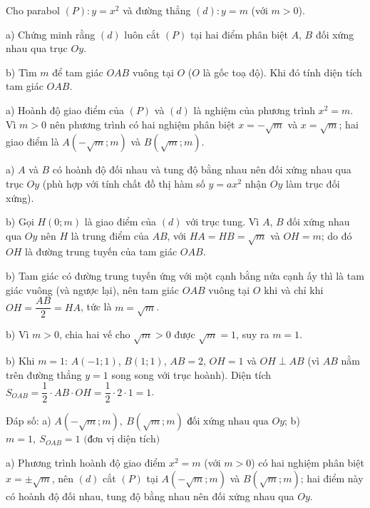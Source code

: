 \begin{problem}[9DS-HSB2-015]
Cho parabol $(P)\colon y = x^2$ và đường thẳng $(d)\colon y = m$ (với $m > 0$).

a) Chứng minh rằng $(d)$ luôn cắt $(P)$ tại hai điểm phân biệt $A$, $B$ đối xứng nhau qua trục $Oy$.

b) Tìm $m$ để tam giác $OAB$ vuông tại $O$ ($O$ là gốc toạ độ). Khi đó tính diện tích tam giác $OAB$.

\begin{solution}
a) Hoành độ giao điểm của $(P)$ và $(d)$ là nghiệm của phương trình $x^2 = m$. Vì $m > 0$ nên phương trình có hai nghiệm phân biệt $x = -\sqrt{m}$ và $x = \sqrt{m}$; hai giao điểm là $A\left(-\sqrt{m}; m\right)$ và $B\left(\sqrt{m}; m\right)$.

a) $A$ và $B$ có hoành độ đối nhau và tung độ bằng nhau nên đối xứng nhau qua trục $Oy$ (phù hợp với tính chất đồ thị hàm số $y = ax^2$ nhận $Oy$ làm trục đối xứng).

b) Gọi $H(0; m)$ là giao điểm của $(d)$ với trục tung. Vì $A$, $B$ đối xứng nhau qua $Oy$ nên $H$ là trung điểm của $AB$, với $HA = HB = \sqrt{m}$ và $OH = m$; do đó $OH$ là đường trung tuyến của tam giác $OAB$.

b) Tam giác có đường trung tuyến ứng với một cạnh bằng nửa cạnh ấy thì là tam giác vuông (và ngược lại), nên tam giác $OAB$ vuông tại $O$ khi và chỉ khi $OH = \dfrac{AB}{2} = HA$, tức là $m = \sqrt{m}$.

b) Vì $m > 0$, chia hai vế cho $\sqrt{m} > 0$ được $\sqrt{m} = 1$, suy ra $m = 1$.

b) Khi $m = 1$: $A(-1; 1)$, $B(1; 1)$, $AB = 2$, $OH = 1$ và $OH \perp AB$ (vì $AB$ nằm trên đường thẳng $y = 1$ song song với trục hoành). Diện tích $S_{OAB} = \dfrac{1}{2} \cdot AB \cdot OH = \dfrac{1}{2} \cdot 2 \cdot 1 = 1$.

Đáp số: a) $\boxed{A\left(-\sqrt{m}; m\right),\ B\left(\sqrt{m}; m\right) \text{ đối xứng nhau qua } Oy}$; b) $\boxed{m = 1,\ S_{OAB} = 1 \text{ (đơn vị diện tích)}}$
\end{solution}

\begin{solution}
a) Phương trình hoành độ giao điểm $x^2 = m$ (với $m > 0$) có hai nghiệm phân biệt $x = \pm\sqrt{m}$, nên $(d)$ cắt $(P)$ tại $A\left(-\sqrt{m}; m\right)$ và $B\left(\sqrt{m}; m\right)$; hai điểm này có hoành độ đối nhau, tung độ bằng nhau nên đối xứng nhau qua $Oy$.


\end{solution}
\end{problem}
